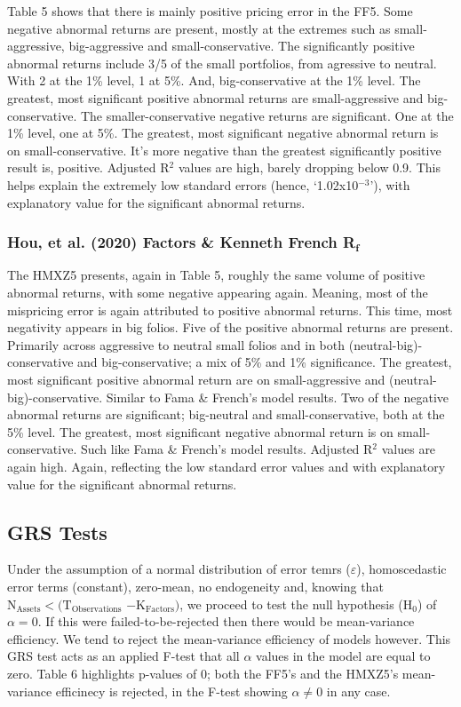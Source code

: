 \documentclass[11pt, english]{article}
\begin{document}
	Table 5 shows that there is mainly positive pricing error in the FF5. Some negative abnormal returns are present, mostly at the extremes such as small-aggressive, big-aggressive and small-conservative. The significantly positive abnormal returns include 3/5 of the small portfolios, from agressive to neutral. With 2 at the 1\% level, 1 at 5\%. And, big-conservative at the 1\% level. The greatest, most significant positive abnormal returns are small-aggressive and big-conservative. The smaller-conservative negative returns are significant. One at the 1\% level, one at 5\%. The greatest, most significant negative abnormal return is on small-conservative. It's more negative than the greatest significantly positive result is, positive. Adjusted R$^2$ values are high, barely dropping below 0.9. This helps explain the extremely low standard errors (hence, `1.02x10$^{-3}$'), with explanatory value for the significant abnormal returns.

		\subsubsection{Hou, et al. (2020) Factors \& Kenneth French R$\mathbf{_f}$}

	The HMXZ5 presents, again in Table 5, roughly the same volume of positive abnormal returns, with some negative appearing again. Meaning, most of the mispricing error is again attributed to positive abnormal returns. This time, most negativity appears in big folios. Five of the positive abnormal returns are present. Primarily across aggressive to neutral small folios and in both (neutral-big)-conservative and big-conservative; a mix of 5\% and 1\% significance. The greatest, most significant positive abnormal return are on small-aggressive and (neutral-big)-conservative. Similar to Fama \& French's model results. Two of the negative abnormal returns are significant; big-neutral and small-conservative, both at the 5\% level. The greatest, most significant negative abnormal return is on small-conservative. Such like Fama \& French's model results. Adjusted R$^2$ values are again high. Again, reflecting the low standard error values and with explanatory value for the significant abnormal returns.

	\subsection{GRS Tests}

	Under the assumption of a normal distribution of error temrs ($\varepsilon$), homoscedastic error terms (constant), zero-mean, no endogeneity and, knowing that $\mathrm{N_{Assets}<(T_{Observations}}$ $\mathrm{-K_{Factors})}$, we proceed to test the null hypothesis (H$_0$) of $\alpha=0$. If this were failed-to-be-rejected then there would be mean-variance efficiency. We tend to reject the mean-variance efficiency of models however. This GRS test acts as an applied F-test that all $\alpha$ values in the model are equal to zero. Table 6 highlights p-values of 0; both the FF5's and the HMXZ5's mean-variance efficinecy is rejected, in the F-test showing $\alpha\neq 0$ in any case. 
\end{document}
